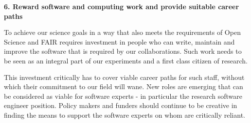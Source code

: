 {\bf 6. Reward software and computing work and provide suitable career paths}

To achieve our science goals in a way that also meets the requirements of Open Science and FAIR requires investment in people who can write, maintain and improve the software that is required by our collaborations. Such work needs to be seen as an integral part of our experiments and a first class citizen of research.

This investment critically has to cover viable career paths for such staff, without which their commitment to our field will wane. New roles are emerging that can be considered as viable for software experts - in particular the research software engineer position. Policy makers and funders should continue to be creative in finding the means to support the software experts on whom are critically reliant.
